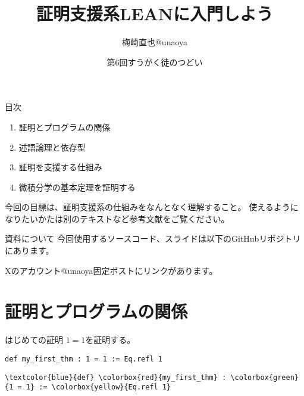 \documentclass[unicode,12pt]{beamer}%
\title{証明支援系LEANに入門しよう}
\author{梅崎直也@unaoya}
\date{第6回すうがく徒のつどい}
\begin{document}
\begin{frame}
  \maketitle
\end{frame}

\begin{frame}{目次}
  \begin{enumerate}
    \item 証明とプログラムの関係
    \item 述語論理と依存型
    \item 証明を支援する仕組み
    \item 微積分学の基本定理を証明する
  \end{enumerate}

  今回の目標は、証明支援系の仕組みをなんとなく理解すること。
  使えるようになりたいかたは別のテキストなど参考文献をご覧ください。
\end{frame}

\begin{frame}{資料について}
  今回使用するソースコード、スライドは以下のGitHubリポジトリにあります。

  Xのアカウント@unaoya固定ポストにリンクがあります。
\end{frame}

\section{証明とプログラムの関係}

\begin{frame}[fragile]{はじめての証明}
  $1=1$を証明する。

  \begin{tcolorbox}[title=Intro.lean]
  \setlength{\baselineskip}{12pt}
  \begin{verbatim}
def my_first_thm : 1 = 1 := Eq.refl 1
  \end{verbatim}
  \end{tcolorbox}

  \pause

  \begin{tcolorbox}[title=Intro.lean]
  \setlength{\baselineskip}{12pt}
  \begin{Verbatim}[commandchars=\\\{\}]
\textcolor{blue}{def} \colorbox{red}{my_first_thm} : \colorbox{green}{1 = 1} := \colorbox{yellow}{Eq.refl 1}    
  \end{Verbatim}
  \end{tcolorbox}  
\end{frame}
\end{document}
